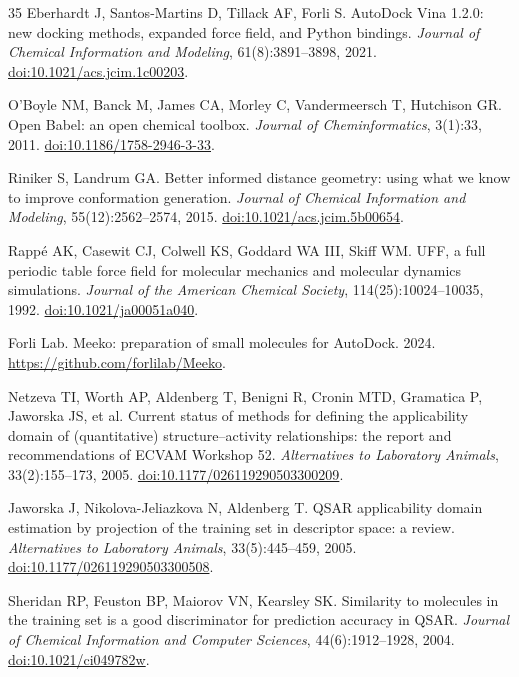 \documentclass[11pt]{article}
\begin{document}
\begin{thebibliography}{35}
Eberhardt J, Santos-Martins D, Tillack AF, Forli S.
AutoDock Vina 1.2.0: new docking methods, expanded force field, and Python bindings.
\textit{Journal of Chemical Information and Modeling}, 61(8):3891--3898, 2021.
\href{https://doi.org/10.1021/acs.jcim.1c00203}{doi:10.1021/acs.jcim.1c00203}.

O'Boyle NM, Banck M, James CA, Morley C, Vandermeersch T, Hutchison GR.
Open Babel: an open chemical toolbox.
\textit{Journal of Cheminformatics}, 3(1):33, 2011.
\href{https://doi.org/10.1186/1758-2946-3-33}{doi:10.1186/1758-2946-3-33}.

Riniker S, Landrum GA.
Better informed distance geometry: using what we know to improve conformation generation.
\textit{Journal of Chemical Information and Modeling}, 55(12):2562--2574, 2015.
\href{https://doi.org/10.1021/acs.jcim.5b00654}{doi:10.1021/acs.jcim.5b00654}.

Rapp\'e AK, Casewit CJ, Colwell KS, Goddard WA III, Skiff WM.
UFF, a full periodic table force field for molecular mechanics and molecular dynamics simulations.
\textit{Journal of the American Chemical Society}, 114(25):10024--10035, 1992.
\href{https://doi.org/10.1021/ja00051a040}{doi:10.1021/ja00051a040}.

Forli Lab.
Meeko: preparation of small molecules for AutoDock.
2024. \url{https://github.com/forlilab/Meeko}.

Netzeva TI, Worth AP, Aldenberg T, Benigni R, Cronin MTD, Gramatica P, Jaworska JS, et al.
Current status of methods for defining the applicability domain of (quantitative) structure--activity relationships: the report and recommendations of ECVAM Workshop 52.
\textit{Alternatives to Laboratory Animals}, 33(2):155--173, 2005.
\href{https://doi.org/10.1177/026119290503300209}{doi:10.1177/026119290503300209}.

Jaworska J, Nikolova-Jeliazkova N, Aldenberg T.
QSAR applicability domain estimation by projection of the training set in descriptor space: a review.
\textit{Alternatives to Laboratory Animals}, 33(5):445--459, 2005.
\href{https://doi.org/10.1177/026119290503300508}{doi:10.1177/026119290503300508}.

Sheridan RP, Feuston BP, Maiorov VN, Kearsley SK.
Similarity to molecules in the training set is a good discriminator for prediction accuracy in QSAR.
\textit{Journal of Chemical Information and Computer Sciences}, 44(6):1912--1928, 2004.
\href{https://doi.org/10.1021/ci049782w}{doi:10.1021/ci049782w}.


\end{thebibliography}
\end{document}
